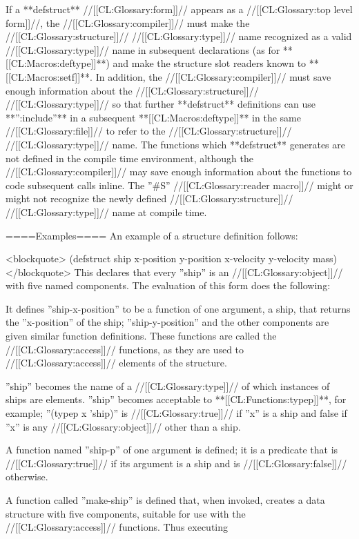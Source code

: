 If a **defstruct** //[[CL:Glossary:form]]// appears as a //[[CL:Glossary:top level form]]//, the //[[CL:Glossary:compiler]]// must make the //[[CL:Glossary:structure]]// //[[CL:Glossary:type]]// name recognized as a valid //[[CL:Glossary:type]]// name in subsequent declarations (as for **[[CL:Macros:deftype]]**) and make the structure slot readers known to **[[CL:Macros:setf]]**. In addition, the //[[CL:Glossary:compiler]]// must save enough information about the //[[CL:Glossary:structure]]// //[[CL:Glossary:type]]// so that further **defstruct** definitions can use **'':include''** in a subsequent **[[CL:Macros:deftype]]** in the same //[[CL:Glossary:file]]// to refer to the //[[CL:Glossary:structure]]// //[[CL:Glossary:type]]// name. The functions which **defstruct** generates are not defined in the compile time environment, although the //[[CL:Glossary:compiler]]// may save enough information about the functions to code subsequent calls inline. The ''#S'' //[[CL:Glossary:reader macro]]// might or might not recognize the newly defined //[[CL:Glossary:structure]]// //[[CL:Glossary:type]]// name at compile time.

====Examples====
An example of a structure definition follows:

<blockquote> (defstruct ship x-position y-position x-velocity y-velocity mass) </blockquote> This declares that every ''ship'' is an //[[CL:Glossary:object]]// with five named components. The evaluation of this form does the following:

\beginlist {} It defines ''ship-x-position'' to be a function of one argument, a ship, that returns the ''x-position'' of the ship; ''ship-y-position'' and the other components are given similar function definitions. These functions are called the //[[CL:Glossary:access]]// functions, as they are used to //[[CL:Glossary:access]]// elements of the structure.

 ''ship'' becomes the name of a //[[CL:Glossary:type]]// of which instances of ships are elements. ''ship'' becomes acceptable to **[[CL:Functions:typep]]**, for example; ''(typep x 'ship)'' is //[[CL:Glossary:true]]// if ''x'' is a ship and false if ''x'' is any //[[CL:Glossary:object]]// other than a ship.

 A function named ''ship-p'' of one argument is defined; it is a predicate that is //[[CL:Glossary:true]]// if its argument is a ship and is //[[CL:Glossary:false]]// otherwise.

 A function called ''make-ship'' is defined that, when invoked, creates a data structure with five components, suitable for use with the //[[CL:Glossary:access]]// functions. Thus executing

